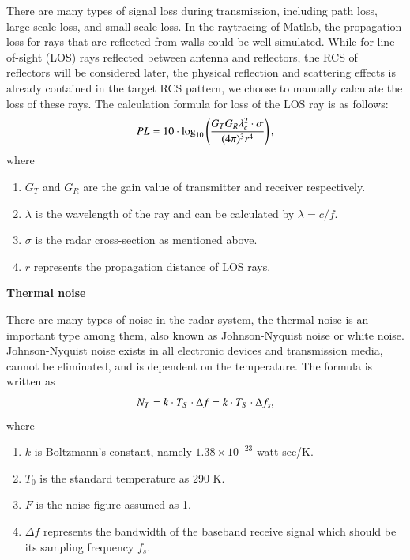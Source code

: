 \documentclass[12pt,DIV14,BCOR12mm,a4paper,footinclude=false,headinclude,parskip=half-,twoside,openright,cleardoublepage=empty,toc=index,bibliography=totoc,listof=totoc]{scrreprt}
\numberwithin{equation}{chapter}
\begin{document}
There are many types of signal loss during transmission, including path loss, large-scale loss, and small-scale loss. In the raytracing of Matlab, the propagation loss for rays that are reflected from walls could be well simulated. While for line-of-sight (LOS) rays reflected between antenna and reflectors, the RCS of reflectors will be considered later, the physical reflection and scattering effects is already contained in the target RCS pattern, we choose to manually calculate the loss of these rays. The calculation formula for loss of the LOS ray \cite{path_loss} is as follows:
\begin{equation}
    \centering
    PL = 10\cdot\log_{10}\left(\frac{G_{T}G_{R}\lambda_{c}^{2}\cdot\sigma}{(4\pi)^{3} r^{4}}\right),
    \label{path loss formula}
\end{equation}
where
\begin{enumerate}[label=\textbullet]
    \item $G_T$ and $G_R$ are the gain value of transmitter and receiver respectively.
    \item $\lambda$ is the wavelength of the ray and can be calculated by $\lambda=c/f$.
    \item $\sigma$ is the radar cross-section as mentioned above.
    \item $r$ represents the propagation distance of LOS rays.
\end{enumerate}

\begin{spacing}{1.5}
\textbf{\large{Thermal noise}}
\end{spacing}

There are many types of noise in the radar system, the thermal noise is an important type among them, also known as Johnson-Nyquist noise \cite{richards_principles_2010} or white noise. Johnson-Nyquist noise exists in all electronic devices and transmission media, cannot be eliminated, and is dependent on the temperature. The formula is written as
\begin{equation}
    \centering
    N_{T} = k \cdot T_{S} \cdot \Delta f = k \cdot T_{S} \cdot \Delta f_s,
    \label{thermal noise formula}
\end{equation}
where
\begin{enumerate}[label=\textbullet]
    \item $k$ is Boltzmann's constant, namely $1.38 \times 10^{-23}$ watt-sec/K.
    \item $T_0$ is the standard temperature as 290 K.
    \item $F$ is the noise figure assumed as 1.
    \item $\Delta f$ represents the bandwidth of the baseband receive signal which should be its sampling frequency $f_s$.
\end{enumerate}
\end{document}
